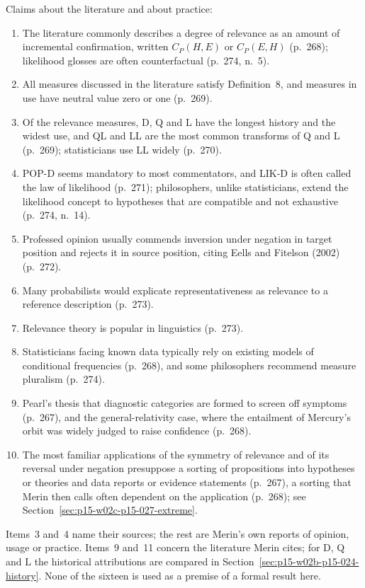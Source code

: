 Claims about the literature and about practice:
\begin{enumerate}
\item[7.] The literature commonly describes a degree of relevance as an
  amount of incremental confirmation, written \(C_P(H,E)\) or
  \(C_P(E,H)\) (p.~268); likelihood glosses are often counterfactual
  (p.~274, n.~5).
\item[8.] All measures discussed in the literature satisfy
  Definition~8, and measures in use have neutral value zero or one
  (p.~269).
\item[9.] Of the relevance measures, D, Q and L have the longest
  history and the widest use, and QL and LL are the most common
  transforms of Q and L (p.~269); statisticians use LL widely
  (p.~270).
\item[10.] POP-D seems mandatory to most commentators, and LIK-D is
  often called the law of likelihood (p.~271); philosophers, unlike
  statisticians, extend the likelihood concept to hypotheses that are
  compatible and not exhaustive (p.~274, n.~14).
\item[11.] Professed opinion usually commends inversion under negation
  in target position and rejects it in source position, citing Eells
  and Fitelson (2002) (p.~272).
\item[12.] Many probabilists would explicate representativeness as
  relevance to a reference description (p.~273).
\item[13.] Relevance theory is popular in linguistics (p.~273).
\item[14.] Statisticians facing known data typically rely on existing
  models of conditional frequencies (p.~268), and some philosophers
  recommend measure pluralism (p.~274).
\item[15.] Pearl's thesis that diagnostic categories are formed to
  screen off symptoms (p.~267), and the general-relativity case, where
  the entailment of Mercury's orbit was widely judged to raise
  confidence (p.~268).
\item[16.] The most familiar applications of the symmetry of relevance
  and of its reversal under negation presuppose a sorting of
  propositions into hypotheses or theories and data reports or evidence
  statements (p.~267), a sorting that Merin then calls often dependent on
  the application (p.~268); see
  Section~\ref{sec:p15-w02c-p15-027-extreme}.
\end{enumerate}
Items~3 and~4 name their sources; the rest are Merin's own reports of
opinion, usage or practice. Items~9 and~11 concern the literature
Merin cites; for D, Q and L the historical attributions are compared in
Section~\ref{sec:p15-w02b-p15-024-history}. None of the sixteen is
used as a premise of a formal result here.

